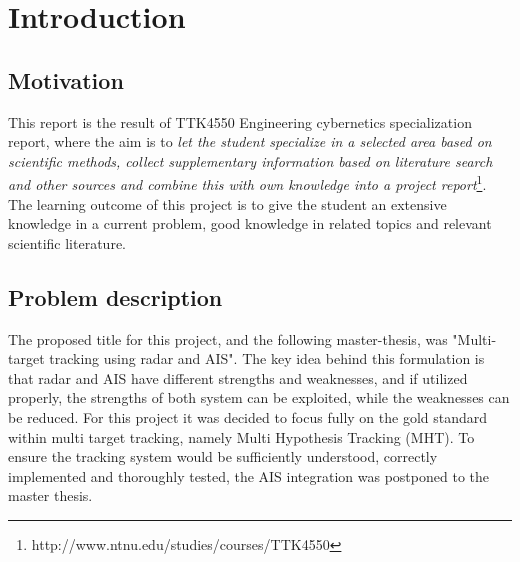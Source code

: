 \section{Introduction}
\subsection{Motivation}
This report is the result of TTK4550 Engineering cybernetics specialization report, where the aim is to \emph{let the student specialize in a selected area based on scientific methods, collect supplementary information based on literature search and other sources and combine this with own knowledge into a project report}\footnote{http://www.ntnu.edu/studies/courses/TTK4550}. The learning outcome of this project is to give the student an extensive knowledge in a current problem, good knowledge in related topics and relevant scientific literature.





\subsection{Problem description}
The proposed title for this project, and the following master-thesis, was "Multi-target tracking using radar and AIS". The key idea behind this formulation is that radar and AIS have different strengths and weaknesses, and if utilized properly, the strengths of both system can be exploited, while the weaknesses can be reduced. For this project it was decided to focus fully on the gold standard within multi target tracking, namely Multi Hypothesis Tracking (MHT). To ensure the tracking system would be sufficiently understood, correctly implemented and thoroughly tested, the AIS integration was postponed to the master thesis.

